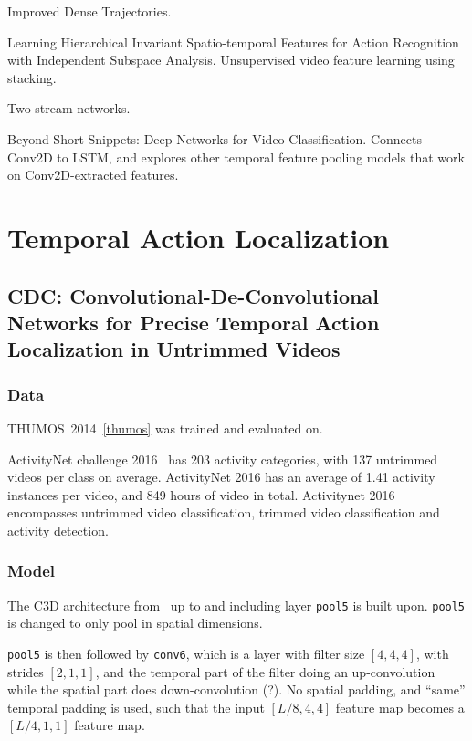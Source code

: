 \documentclass[a4paper, 12pt]{article}
\begin{document}
Improved Dense Trajectories\cite{Wang2013}.

Learning Hierarchical Invariant Spatio-temporal Features for Action Recognition
with Independent Subspace Analysis\cite{Le:2011:LHI:2191740.2192108}.
Unsupervised video feature learning using stacking.

Two-stream networks\cite{DBLP:journals/corr/SimonyanZ14}.

Beyond Short Snippets: Deep Networks for Video
Classification\cite{DBLP:journals/corr/NgHVVMT15}. Connects Conv2D to LSTM, and
explores other temporal feature pooling models that work on Conv2D-extracted
features.

\section{Temporal Action Localization}

\subsection{CDC\@: Convolutional-De-Convolutional Networks for Precise Temporal
            Action Localization in Untrimmed
            Videos~\cite{DBLP:journals/corr/ShouCZMC17}}

\subsubsection{Data}

THUMOS~2014~\ref{thumos} was trained and evaluated on.

ActivityNet challenge 2016~\cite{Heilbron_2015_CVPR} has 203 activity
categories, with 137 untrimmed videos per class on average. ActivityNet 2016
has an average of 1.41 activity instances per video, and 849 hours of video in
total. Activitynet 2016 encompasses untrimmed video classification, trimmed
video classification and activity detection.

\subsubsection{Model}

The C3D architecture
from~\cite{DBLP:journals/corr/TranBFTP15, DBLP:journals/corr/TranBFTP14} up to
and including layer \verb|pool5| is built upon. \verb|pool5| is changed to only
pool in spatial dimensions.

\verb|pool5| is then followed by \verb|conv6|, which is a layer with filter
size $[4, 4, 4]$, with strides $[2, 1, 1]$, and the temporal part of the filter
doing an up-convolution while the spatial part does down-convolution (?). No
spatial padding, and ``same'' temporal padding is used, such that the input
$[L/8, 4, 4]$ feature map becomes a $[L/4, 1, 1]$ feature map.
\end{document}
